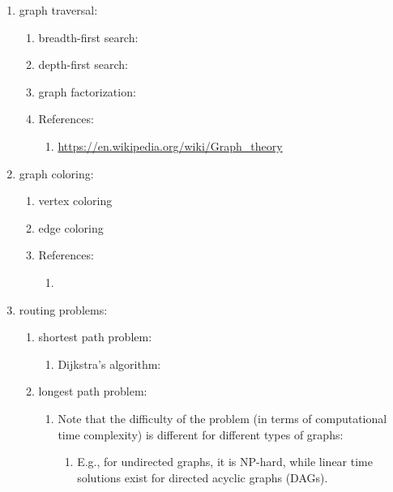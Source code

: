 \begin{enumerate} \itemsep -4pt
\item graph traversal: \vspace{-0.3cm}
	\begin{enumerate} \itemsep -2pt
	\item breadth-first search: \url{}
	\item depth-first search: \url{}
	\item graph factorization: \url{}
	\item References: \vspace{-0.2cm}
		\begin{enumerate} \itemsep -2pt
		\item \url{https://en.wikipedia.org/wiki/Graph_theory}
		\end{enumerate}
	\end{enumerate}
\item graph coloring: \vspace{-0.3cm}
	\begin{enumerate} \itemsep -2pt
	\item vertex coloring
	\item edge coloring
	\item References: \vspace{-0.2cm}
		\begin{enumerate} \itemsep -2pt
		\item 
		\end{enumerate}
	\end{enumerate}
\item routing problems: \vspace{-0.3cm}
	\begin{enumerate} \itemsep -2pt
	\item shortest path problem: \vspace{-0.2cm}
		\begin{enumerate} \itemsep -2pt
		\item Dijkstra's algorithm: \url{}
		\end{enumerate}
	\item longest path problem: \vspace{-0.2cm}
		\begin{enumerate} \itemsep -2pt
		\item Note that the difficulty of the problem (in terms of computational time complexity) is different for different types of graphs: \vspace{-0.1cm}
			\begin{enumerate} \itemsep -1pt
			\item E.g., for undirected graphs, it is NP-hard, while linear time solutions exist for directed acyclic graphs (DAGs).

\end{enumerate}
\end{enumerate}
\end{enumerate}
\end{enumerate}
